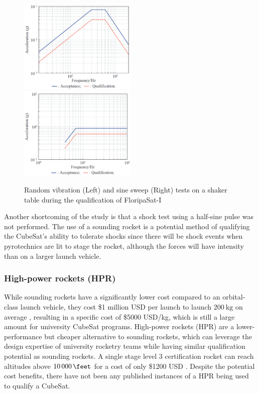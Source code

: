 \documentclass[a4paper,11pt]{article}
\begin{document}
\begin{figure}[H]
  \includegraphics[width=0.5\textwidth]{images/floripa-random-spectrum.png}
  \includegraphics[width=0.5\textwidth]{images/floripa-sinusoid.png}
  \label{fig:shaker}
  \caption{Random vibration (Left) and sine sweep (Right) tests on a shaker table during the qualification of FloripaSat-I \cite{9316404}}
\end{figure}

Another shortcoming of the study is that a shock test using a half-sine pulse was not performed. The use of a sounding rocket is a potential method of qualifying the CubeSat's ability to tolerate shocks since there will be shock events when pyrotechnics are lit to stage the rocket, although the forces will have intensity than on a larger launch vehicle.

\subsubsection{High-power rockets (HPR)}
While sounding rockets have a significantly lower cost compared to an orbital-class launch vehicle, they cost \$1 million USD per launch to launch $\SI{200}{\kilo\gram}$ on average \cite{jurist2009commercial}, resulting in a specific cost of \$5000 USD/kg, which is still a large amount for university CubeSat programs. High-power rockets (HPR) are a lower-performance but cheaper alternative to sounding rockets, which can leverage the design expertise of university rocketry teams while having similar qualification potential as sounding rockets. A single stage level 3 certification rocket can reach altitudes above $\SI{10000}{\feet}$ \cite{canepa2005modern} for a cost of only \$1200 USD \cite{canepa2005modern}. Despite the potential cost benefits, there have not been any published instances of a HPR being used to qualify a CubeSat.
\end{document}
